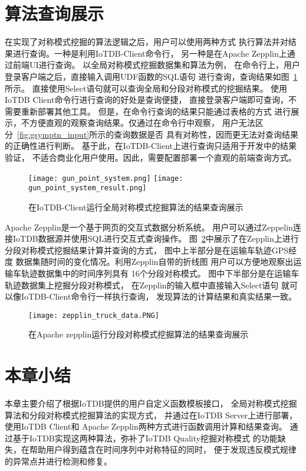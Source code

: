 \section{算法查询展示}

在实现了对称模式挖掘的算法逻辑之后，用户可以使用两种方式
执行算法并对结果进行查询。一种是利用IoTDB-Client命令行，
另一种是在Apache Zepplin上通过前端UI进行查询。
以全局对称模式挖掘数据集和算法为例，
在命令行上，用户登录客户端之后，直接输入调用UDF函数的SQL语句
进行查询，查询结果如图~\ref{fig:iotdb_client_symptn}所示。
直接使用Select语句就可以查询全局和分段对称模式的挖掘结果。
使用IoTDB Client命令行进行查询的好处是查询便捷，
直接登录客户端即可查询，不需要重新部署其他工具。
但是，在命令行查询的结果只能通过表格的方式
进行展示，不方便直观的观察查询结果。仅通过在命令行中观察，
用户无法区分~\ref{fig:gsymptn_input}所示的查询数据是否
具有对称性，因而更无法对查询结果的正确性进行判断。
基于此，在IoTDB-Client上进行查询只适用于开发中的结果验证，
不适合商业化用户使用。因此，需要配置部署一个直观的前端查询方式。
\begin{figure}
    \centering
    {\texttt{[image: gun\_point\_system.png]}}
    {\texttt{[image: gun\_point\_system\_result.png]}}
    \caption{在IoTDB-Client运行全局对称模式挖掘算法的结果查询展示}
    \label{fig:iotdb_client_symptn}
\end{figure}

Apache Zepplin是一个基于网页的交互式数据分析系统。
用户可以通过Zeppelin连接IoTDB数据源并使用SQL进行交互式查询操作。
图~\ref{fig:iotdb_zepplin_symptn}中展示了在Zepplin上进行
分段对称模式挖掘结果计算并查询的方式，
图中上半部分是在运输车轨迹GPS经度
数据集随时间的变化情况。利用Zepplin自带的折线图
用户可以方便地观察出运输车轨迹数据集中的时间序列具有
16个分段对称模式。
图中下半部分是在运输车轨迹数据集上挖掘分段对称模式，
在Zepplin的输入框中直接输入Select语句
就可以像IoTDB-Client命令行一样执行查询，
发现算法的计算结果和真实结果一致。
\begin{figure}
    \centering
    \texttt{[image: zepplin\_truck\_data.PNG]}
    \caption{在Apache zepplin运行分段对称模式挖掘算法的结果查询展示}
    \label{fig:iotdb_zepplin_symptn}
\end{figure}


\section{本章小结}
本章主要介绍了根据IoTDB提供的用户自定义函数模板接口，
全局对称模式挖掘算法和分段对称模式挖掘算法的实现方式，
并通过在IoTDB Server上进行部署，使用IoTDB Client和
Apache Zepplin两种方式进行函数调用计算和结果查询。
通过基于IoTDB实现这两种算法，弥补了IoTDB Quality挖掘对称模式
的功能缺失，在帮助用户得到蕴含在时间序列中对称特征的同时，
便于发现违反模式规律的异常点并进行检测和修复。